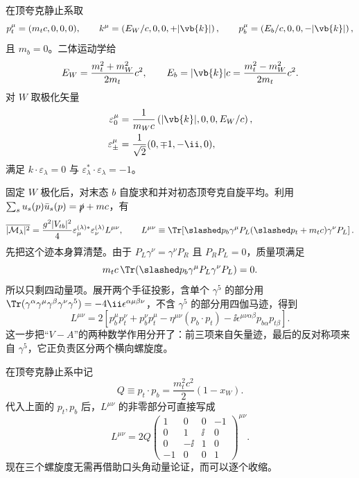 \begin{derivation}[顶夸克衰变中的矢量螺旋度比例]
在顶夸克静止系取
\begin{equation*}
 p_t^\mu=(m_tc,0,0,0),
 \qquad
 k^\mu=\left(E_W/c,0,0,+|\vb{k}|\right),
 \qquad
 p_b^\mu=\left(E_b/c,0,0,-|\vb{k}|\right),
\end{equation*}
且 $m_b=0$。二体运动学给
\begin{equation*}
 E_W=\frac{m_t^2+m_W^2}{2m_t}c^2,
 \qquad
 E_b=|\vb{k}|c=\frac{m_t^2-m_W^2}{2m_t}c^2.
\end{equation*}
对 $W$ 取极化矢量
\begin{align*}
 \varepsilon_0^\mu
 &=\frac1{m_Wc}\left(|\vb{k}|,0,0,E_W/c\right),\\
 \varepsilon_\pm^\mu
 &=\frac1{\sqrt2}(0,\mp1,-\ii,0),
\end{align*}
满足 $k\cdot\varepsilon_\lambda=0$ 与 $\varepsilon_\lambda^*\cdot\varepsilon_\lambda=-1$。

固定 $W$ 极化后，对末态 $b$ 自旋求和并对初态顶夸克自旋平均。利用
\(\sum_su_s(p)\bar u_s(p)=\slashed p+mc\)，有
\begin{equation*}
 \overline{|\mathcal M_\lambda|^2}
 =\frac{g^2|V_{tb}|^2}{4}
 \varepsilon_{\mu}^{(\lambda)*}\varepsilon_\nu^{(\lambda)}
 L^{\mu\nu},
\qquad
 L^{\mu\nu}\equiv
 \Tr\!\left[
 \slashed p_b\gamma^\mu P_L(\slashed p_t+m_tc)
 \gamma^\nu P_L
 \right].
\end{equation*}
先把这个迹本身算清楚。由于
\(P_L\gamma^\nu=\gamma^\nu P_R\) 且 $P_RP_L=0$，质量项满足
\begin{equation*}
 m_tc\,\Tr(\slashed p_b\gamma^\mu P_L\gamma^\nu P_L)=0.
\end{equation*}
所以只剩四动量项。展开两个手征投影，含单个 $\gamma^5$ 的部分用
\(\Tr(\gamma^\alpha\gamma^\mu\gamma^\beta\gamma^\nu\gamma^5)
=-4\ii\epsilon^{\alpha\mu\beta\nu}\)，不含 $\gamma^5$ 的部分用四伽马迹，得到
\begin{equation*}
{
L^{\mu\nu}
=2\left[
 p_b^\mu p_t^\nu+p_b^\nu p_t^\mu
 -\eta^{\mu\nu}(p_b\cdot p_t)
 -\ii\epsilon^{\mu\nu\alpha\beta}p_{b\alpha}p_{t\beta}
 \right].}
\end{equation*}
这一步把“$V-A$”的两种数学作用分开了：前三项来自矢量迹，最后的反对称项来自 $\gamma^5$，它正负责区分两个横向螺旋度。

在顶夸克静止系中记
\begin{equation*}
 Q\equiv p_t\cdot p_b
 =\frac{m_t^2c^2}{2}(1-x_W).
\end{equation*}
代入上面的 $p_t,p_b$ 后，$L^{\mu\nu}$ 的非零部分可直接写成
\begin{equation*}
L^{\mu\nu}
=2Q
\begin{pmatrix}
 1&0&0&-1\\
 0&1&\ii&0\\
 0&-\ii&1&0\\
 -1&0&0&1
\end{pmatrix}^{\mu\nu}.
\end{equation*}
现在三个螺旋度无需再借助口头角动量论证，而可以逐个收缩。


\end{derivation}
